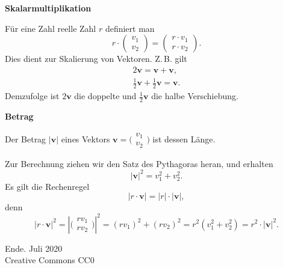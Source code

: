\documentclass[9pt]{beamer}
\newcommand{\modest}[1]{{\small\color{gray}#1}}
\newcommand{\bv}[1]{\mathbf{#1}}
\newcommand{\strong}[1]{\textsf{\textbf{#1}}}
\newcommand{\icol}[1]{
  \big(\!\begin{smallmatrix}#1\end{smallmatrix}\!\big)%
}
\newcommand{\parspace}{\vspace{0.8em}}
\begin{document}
\begin{frame}
\begin{center}
\strong{Skalarmultiplikation}
\end{center}
\end{frame}

\begin{frame}
Für eine Zahl reelle Zahl $r$ definiert man
\[r\cdot\begin{pmatrix}v_1\\ v_2\end{pmatrix}
= \begin{pmatrix}r\cdot v_1\\ r\cdot v_2\end{pmatrix}.\]\pause
Dies dient zur Skalierung von Vektoren. Z.\,B. gilt
\begin{gather*}
2\bv v = \bv v + \bv v,\\
\tfrac{1}{2}\bv v + \tfrac{1}{2}\bv v = \bv v.
\end{gather*}
Demzufolge ist $2\bv v$ die doppelte und $\tfrac{1}{2}\bv v$ die halbe
Verschiebung.
\end{frame}


\begin{frame}
\begin{center}
\strong{Betrag}
\end{center}
\end{frame}

\begin{frame}
Der Betrag $|\bv v|$ eines Vektors $\bv v = \icol{v_1\\ v_2}$ ist dessen Länge.\pause

\parspace
Zur Berechnung ziehen wir den Satz des Pythagoras heran, und erhalten
\[|\bv v|^2 = v_1^2+v_2^2.\]\pause
Es gilt die Rechenregel
\[|r\cdot\bv v| = |r|\cdot|\bv v|,\]
denn
\[|r\cdot\bv v|^2 = |\icol{rv_1\\ rv_2}|^2
= (rv_1)^2+(rv_2)^2 = r^2(v_1^2+v_2^2) = r^2\cdot |\bv v|^2.\]
\end{frame}

\begin{frame}
Ende.
\vfill\hfill\modest{Juli 2020}\\
\hfill\modest{Creative Commons CC0}
\end{frame}
\end{document}
